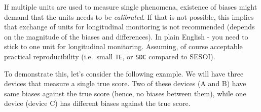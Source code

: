 \documentclass[
]{book}
\begin{document}
If multiple units are used to measure single phenomena, existence of biases might demand that the units needs to be \emph{calibrated}. If that is not possible, this implies that exchange of units for longitudinal monitoring is not recommended (depends on the magnitude of the biases and differences). In plain English - you need to stick to one unit for longitudinal monitoring. Assuming, of course acceptable practical reproducibility (i.e.~small \texttt{TE}, or \texttt{SDC} compared to SESOI).

To demonstrate this, let's consider the following example. We will have three devices that measure a single true score. Two of these devices (A and B) have same biases against the true score (hence, no biases between them), while one device (device C) has different biases against the true score.
\end{document}
